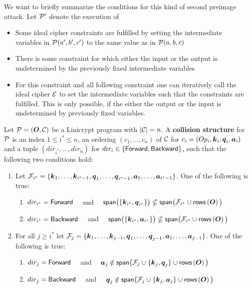 We want to briefly summarize the conditions for this kind of second preimage attack.
Let $\P'$ denote the execution of 
\begin{itemize}
\item
    Some ideal cipher constraints are fulfilled by setting the intermediate variables in $\P(a',b',c')$ to the same value as in $\P(a,b,c)$ 
\item
    There is some constraint for which either the input or the output is undetermined by the previously fixed intermediate variables
\item
    For this constraint and all following constraint one can iteratively call the ideal cipher $\BC$ to set the intermediate variables such that the constraints are fulfilled.
    This is only possible, if the either the output or the input is undetermined by previously fixed variables.
\end{itemize}


\begin{defn}
Let $\P = (\O, \C)$ be a Linicrypt program with $|\C| = n$.
A \textbf{collision structure} for $\P$ is an index $1 \leq i^* \leq n$, an ordering $(c_1, \dots, c_n)$ of $\C$ for $c_i = (Op_i, \v k_i, \v q_i,\v a_i)$
and a tuple $(dir_{i^*}, \dots, dir_n)$ for $dir_i \in \{\For, \Back\}$,
such that the following two conditions hold:
\begin{enumerate}
\item 
Let $\mathcal{F}_\is = \{
    \v k_1, \dots, \v k_{i^* -1},
    \v q_1, \dots, \v q_{i^* -1},
    \v a_1, \dots, \v a_{i^* -1}
    \}$. One of the following is true:
        \begin{enumerate}
    \item $dir_\is = \For \quad$ and 
        $\quad
            \spn\big(\{ \v k_{i^*}, \v q_{i^*} \}\big) \nsubseteq
            \spn\big( \mathcal{F}_\is \cup \rows\left(\O\right) \big)
        $
    \item $dir_\is = \Back \quad$ and 
        $\quad
            \spn\big(\{ \v k_{i^*}, \v a_{i^*} \}\big) \nsubseteq
            \spn\big( \mathcal{F}_\is \cup \rows\left(\O\right) \big)
        $
\end{enumerate}
\item For all $j \geq i^*$ let $\mathcal{F}_j = \{
    \v k_1, \dots, \v k_{j -1},
    \v q_1, \dots, \v q_{j -1},
    \v a_1, \dots, \v a_{j -1}
    \}$. One of the following is true:
\begin{enumerate}
    \item $dir_j = \For \quad$ and 
        $\quad
        \v a_j \notin \spn\big(
        \mathcal{F}_j
        \cup \{ \v k_j, \v q_j\}
        \cup \rows\left(\O\right)
        \big)
        $
    \item $dir_j = \Back \quad$ and 
        $\quad
        \v q_j \notin \spn\big(
        \mathcal{F}_j
        \cup \{ \v k_j, \v a_j\}
        \cup \rows\left(\O\right)
        \big)
        $
\end{enumerate}
\end{enumerate}
\end{defn}

